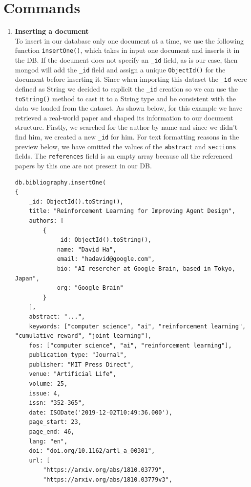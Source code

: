 \section{Commands}
\label{sec:commands_mongodb}%
\begin{enumerate}
    \item \textbf{Inserting a document} \\
    To insert in our database only one document at a time, we use the following function \verb|insertOne()|, which takes in input one document and inserts it in the DB. If the document does not specify an \verb|_id| field, as is our case, then mongod\footnotemark{} will add the \verb|_id| field and assign a unique \verb|ObjectId()| for the document before inserting it.
    Since when importing this dataset the \verb|_id| were defined as String we decided to explicit the \verb|_id| creation so we can use the \verb|toString()| method to cast it to a String type and be consistent with the data we loaded from the dataset.
    As shown below, for this example we have retrieved a real-world paper and shaped its information to our document structure.
    Firstly, we searched for the author by name and since we didn't find him, we created a new \verb|_id| for him.
    For text formatting reasons in the preview below, we have omitted the values of the \verb|abstract| and \verb|sections| fields.
    The \verb|references| field is an empty array because all the referenced papers by this one are not present in our DB\@.
    \begin{lstlisting}[label={lst:command1mongodb1}]
db.bibliography.insertOne(
{
    _id: ObjectId().toString(),
    title: "Reinforcement Learning for Improving Agent Design",
    authors: [
        {
            _id: ObjectId().toString(),
            name: "David Ha",
            email: "hadavid@google.com",
            bio: "AI resercher at Google Brain, based in Tokyo, Japan",
            org: "Google Brain"
        }
    ],
    abstract: "...",
    keywords: ["computer science", "ai", "reinforcement learning", "cumulative reward", "joint learning"],
    fos: ["computer science", "ai", "reinforcement learning"],
    publication_type: "Journal",
    publisher: "MIT Press Direct",
    venue: "Artificial Life",
    volume: 25,
    issue: 4,
    issn: "352-365",
    date: ISODate('2019-12-02T10:49:36.000'),
    page_start: 23,
    page_end: 46,
    lang: "en",
    doi: "doi.org/10.1162/artl_a_00301",
    url: [
        "https://arxiv.org/abs/1810.03779",
        "https://arxiv.org/abs/1810.03779v3",

\end{lstlisting}
\end{enumerate}
